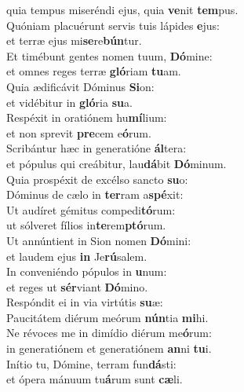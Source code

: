 \evenverse quia tempus miseréndi ejus, quia \textbf{ve}nit \textbf{tem}pus.\\
\oddverse Quóniam placuérunt servis tuis lápides \textbf{e}jus:~\*\\
\oddverse et terræ ejus mi\textbf{se}re\textbf{bún}tur.\\
\evenverse Et timébunt gentes nomen tuum, \textbf{Dó}mine:~\*\\
\evenverse et omnes reges terræ \textbf{gló}riam \textbf{tu}am.\\
\oddverse Quia ædificávit Dóminus \textbf{Si}on:~\*\\
\oddverse et vidébitur in \textbf{gló}ria \textbf{su}a.\\
\evenverse Respéxit in oratiónem hu\textbf{mí}lium:~\*\\
\evenverse et non sprevit \textbf{pre}cem e\textbf{ó}rum.\\
\oddverse Scribántur hæc in generatióne \textbf{ál}tera:~\*\\
\oddverse et pópulus qui creábitur, lau\textbf{dá}bit \textbf{Dó}minum.\\
\evenverse Quia prospéxit de excélso sancto \textbf{su}o:~\*\\
\evenverse Dóminus de cælo in \textbf{ter}ram a\textbf{spé}xit:\\
\oddverse Ut audíret gémitus compedi\textbf{tó}rum:~\*\\
\oddverse ut sólveret fílios in\textbf{te}rem\textbf{ptó}rum.\\
\evenverse Ut annúntient in Sion nomen \textbf{Dó}mini:~\*\\
\evenverse et laudem ejus \textbf{in} Je\textbf{rú}salem.\\
\oddverse In conveniéndo pópulos in \textbf{u}num:~\*\\
\oddverse et reges ut \textbf{sér}viant \textbf{Dó}mino.\\
\evenverse Respóndit ei in via virtútis \textbf{su}æ:~\*\\
\evenverse Paucitátem diérum meórum \textbf{nún}tia \textbf{mi}hi.\\
\oddverse Ne révoces me in dimídio diérum me\textbf{ó}rum:~\*\\
\oddverse in generatiónem et generatiónem \textbf{an}ni \textbf{tu}i.\\
\evenverse Inítio tu, Dómine, terram fun\textbf{dá}sti:~\*\\
\evenverse et ópera mánuum tu\textbf{á}rum sunt \textbf{cæ}li.\\
